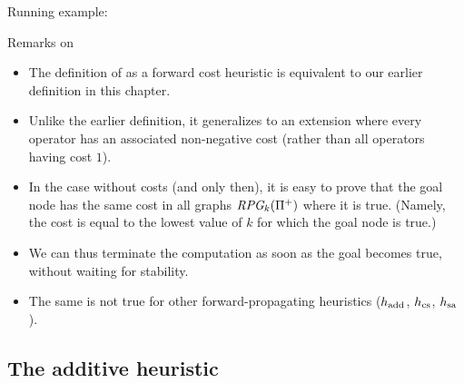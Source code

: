 \documentclass{gkibeamer}
\begin{document}
\begin{frame}{Running example: \hmax}
\begin{center}
  \end{center}
\end{frame}

\begin{frame}{Remarks on {\hmax}}
  \begin{itemize}
  \item The definition of {\hmax} as a forward cost heuristic is
    equivalent to our earlier definition in this chapter.
  \item Unlike the earlier definition, it generalizes to an extension
    where every operator has an associated non-negative \alert{cost}
    (rather than all operators having cost $1$).
  \item In the case without costs (and only then), it is easy to prove
    that the goal node has the same cost in all graphs
    $\textit{RPG}_k({\Pi}^+)$ where it is true. (Namely, the
    cost is equal to the lowest value of $k$ for which the goal
    node is true.)
  \item We can thus terminate the computation as soon as the goal
    becomes true, without waiting for stability.
  \item The same is \alert{not true} for other forward-propagating
    heuristics ($h_{\text{add}}$, $h_{\text{cs}}$, $h_{\text{sa}}$).
  \end{itemize}
\end{frame}

\subsection[\hadd]{The additive heuristic \hadd}
\end{document}
